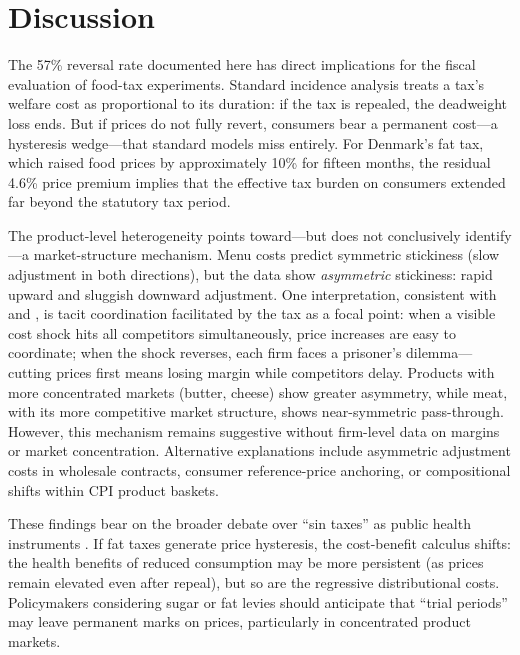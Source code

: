 \documentclass[12pt]{article}
\begin{document}
\section{Discussion}

The 57\% reversal rate documented here has direct implications for the fiscal evaluation of food-tax experiments. Standard incidence analysis treats a tax's welfare cost as proportional to its duration: if the tax is repealed, the deadweight loss ends. But if prices do not fully revert, consumers bear a permanent cost---a hysteresis wedge---that standard models miss entirely. For Denmark's fat tax, which raised food prices by approximately 10\% for fifteen months, the residual 4.6\% price premium implies that the effective tax burden on consumers extended far beyond the statutory tax period.

The product-level heterogeneity points toward---but does not conclusively identify---a market-structure mechanism. Menu costs predict symmetric stickiness (slow adjustment in both directions), but the data show \textit{asymmetric} stickiness: rapid upward and sluggish downward adjustment. One interpretation, consistent with \citet{tappata2009} and \citet{knittel2003}, is tacit coordination facilitated by the tax as a focal point: when a visible cost shock hits all competitors simultaneously, price increases are easy to coordinate; when the shock reverses, each firm faces a prisoner's dilemma---cutting prices first means losing margin while competitors delay. Products with more concentrated markets (butter, cheese) show greater asymmetry, while meat, with its more competitive market structure, shows near-symmetric pass-through. However, this mechanism remains suggestive without firm-level data on margins or market concentration. Alternative explanations include asymmetric adjustment costs in wholesale contracts, consumer reference-price anchoring, or compositional shifts within CPI product baskets.

These findings bear on the broader debate over ``sin taxes'' as public health instruments \citep{allcott2019regressive}. If fat taxes generate price hysteresis, the cost-benefit calculus shifts: the health benefits of reduced consumption may be more persistent (as prices remain elevated even after repeal), but so are the regressive distributional costs. Policymakers considering sugar or fat levies should anticipate that ``trial periods'' may leave permanent marks on prices, particularly in concentrated product markets.
\end{document}
